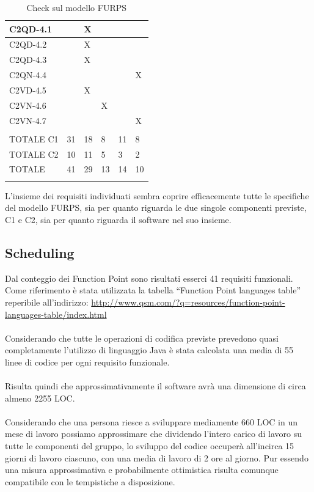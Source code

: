 \begin{footnotesize}
\begin{longtable}{|p{}|p{}|p{}|p{}|p{}|p{}|}
 C2QD-4.1& &  X&  &  &  \\ \hline
 C2QD-4.2& &  X&  &  &  \\ \hline
 C2QD-4.3& &  X&  &  &  \\ \hline
 C2QN-4.4& &  &  &  &  X\\ \hline
 C2VD-4.5& &  X&  &  &  \\ \hline
 C2VN-4.6& &  &  X&  &  \\ \hline
 C2VN-4.7& &  &  &  &  X\\ \hline
         & &  &  &  &  \\ \hline
 TOTALE C1& 31&  18&  8&  11&  8\\ \hline
 TOTALE C2& 10&  11&  5&  3&  2\\ \hline
 TOTALE& 41&  29&  13&  14&  10\\ \hline
\caption{Check sul modello FURPS}
\end{longtable}
\end{footnotesize}

L'insieme dei requisiti individuati sembra coprire efficacemente tutte le
specifiche del modello FURPS, sia per quanto riguarda le due singole componenti
previste, C1 e C2, sia per quanto riguarda il software nel suo insieme.

\subsection*{Scheduling}

Dal conteggio dei Function Point sono risultati esserci 41 requisiti
funzionali. Come riferimento \`e stata utilizzata la tabella ``Function Point
languages table'' reperibile all'indirizzo:
\url{http://www.qsm.com/?q=resources/function-point-languages-table/index.html}
\\\\
Considerando che tutte le operazioni di codifica previste prevedono quasi
completamente l'utilizzo di linguaggio Java \`e stata calcolata una media di 55
linee di codice per ogni requisito funzionale.
\\\\
Risulta quindi che approssimativamente il software avr\`a una dimensione di
circa almeno 2255 LOC.
\\\\
Considerando che una persona riesce a sviluppare mediamente 660 LOC in un mese
di lavoro possiamo approssimare che dividendo l'intero carico di lavoro su tutte le
componenti del gruppo, lo sviluppo del codice occuper\`a all'incirca
15 giorni di lavoro ciascuno, con una media di lavoro di 2 ore al giorno. Pur
essendo una misura approssimativa e probabilmente ottimistica risulta comunque
compatibile con le tempistiche a disposizione.


